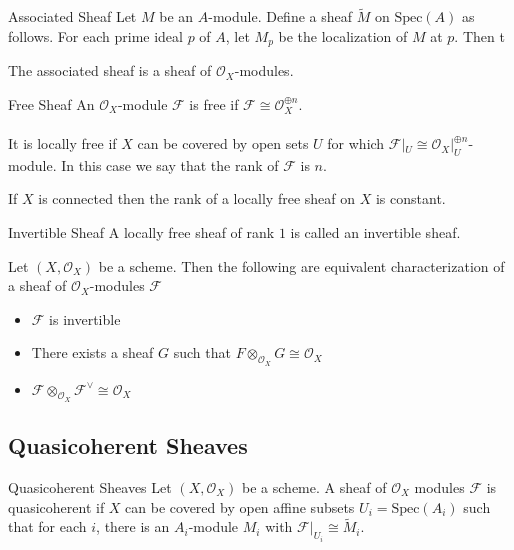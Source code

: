 \documentclass[a4paper]{article}
\begin{document}
\begin{defn}{Associated Sheaf}{} Let $M$ be an $A$-module. Define a sheaf $\tilde{M}$ on $\text{Spec}(A)$ as follows. For each prime ideal $p$ of $A$, let $M_p$ be the localization of $M$ at $p$. Then t
\end{defn}

\begin{lmm}{}{} The associated sheaf is a sheaf of $\mathcal{O}_X$-modules. 
\end{lmm}

\begin{defn}{Free Sheaf}{} An $\mathcal{O}_X$-module $\mathcal{F}$ is free if $\mathcal{F}\cong\mathcal{O}_X^{\oplus n}$. \\~\\
It is locally free if $X$ can be covered by open sets $U$ for which $\mathcal{F}|_U\cong\mathcal{O}_X|_U^{\oplus n}$-module. In this case we say that the rank of $\mathcal{F}$ is $n$. 
\end{defn}

\begin{lmm}{}{} If $X$ is connected then the rank of a locally free sheaf on $X$ is constant. 
\end{lmm}

\begin{defn}{Invertible Sheaf}{} A locally free sheaf of rank $1$ is called an invertible sheaf. 
\end{defn}

\begin{thm}{}{} Let $(X,\mathcal{O}_X)$ be a scheme. Then the following are equivalent characterization of a sheaf of $\mathcal{O}_X$-modules $\mathcal{F}$
\begin{itemize}
\item $\mathcal{F}$ is invertible
\item There exists a sheaf $G$ such that $F\otimes_{\mathcal{O}_X}G\cong\mathcal{O}_X$
\item $\mathcal{F}\otimes_{\mathcal{O}_X}\mathcal{F}^{\vee}\cong\mathcal{O}_X$
\end{itemize}
\end{thm}

\subsection{Quasicoherent Sheaves}
\begin{defn}{Quasicoherent Sheaves}{} Let $(X,\mathcal{O}_X)$ be a scheme. A sheaf of $\mathcal{O}_X$ modules $\mathcal{F}$ is quasicoherent if $X$ can be covered by open affine subsets $U_i=\text{Spec}(A_i)$ such that for each $i$, there is an $A_i$-module $M_i$ with $\mathcal{F}|_{U_i}\cong\tilde{M}_i$. 
\end{defn}
\end{document}

